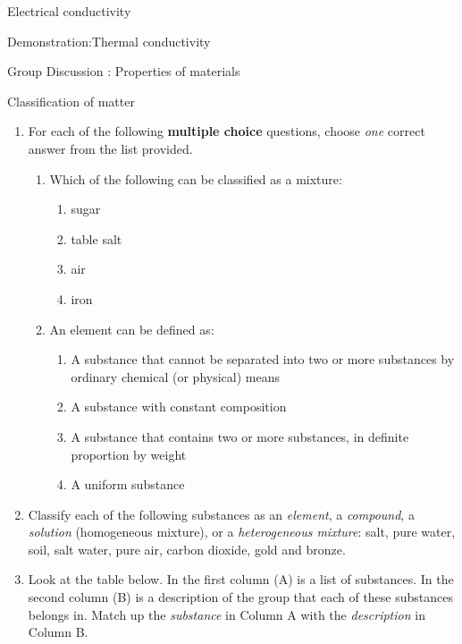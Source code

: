 \begin{iexperiment}{Electrical conductivity}
\begin{gexperiment}{Demonstration:Thermal conductivity}
\begin{Discussion}{Group Discussion : Properties of materials}
\begin{eocexercises}{Classification of matter }
{\begin{enumerate}[noitemsep, label=\textbf{\arabic*}. ]
            \label{m38706*uid133}\item For each of the following \textbf{multiple choice} questions, choose \textsl{one} correct answer from the list provided.
\label{m38706*id67947}\begin{enumerate}[noitemsep, label=\textbf{\alph*}. ] 
            \label{m38706*uid134}\item Which of the following can be classified as a mixture:
\label{m38706*id67963}\begin{enumerate}[noitemsep, label=\textbf{\alph*}. ] 
            \label{m38706*uid135}\item sugar
\label{m38706*uid136}\item table salt
\label{m38706*uid137}\item air
\label{m38706*uid138}\item iron
\end{enumerate}
                \label{m38706*uid139}\item An element can be defined as:
\label{m38706*id68029}\begin{enumerate}[noitemsep, label=\textbf{\alph*}. ] 
            \label{m38706*uid140}\item A substance that cannot be separated into two or more substances by ordinary chemical (or physical) means
\label{m38706*uid141}\item A substance with constant composition
\label{m38706*uid142}\item A substance that contains two or more substances, in definite proportion by weight
\label{m38706*uid143}\item A uniform substance
\end{enumerate}
                \end{enumerate}
\label{m38706*uid144}\item Classify each of the following substances as an \textsl{element}, a \textsl{compound}, a \textsl{solution} (homogeneous mixture), or a \textsl{heterogeneous mixture}: salt, pure water, soil, salt water, pure air, carbon dioxide, gold and bronze.\newline
\label{m38706*uid145}\item Look at the table below. In the first column (A) is a list of substances. In the second column (B) is a description of the group that each of these substances belongs in. Match up the \textsl{substance} in Column A with the \textsl{description} in Column B.
          \begin{table}[H]

\end{table}
\end{enumerate}}
\end{eocexercises}
\end{Discussion}
\end{gexperiment}
\end{iexperiment}
